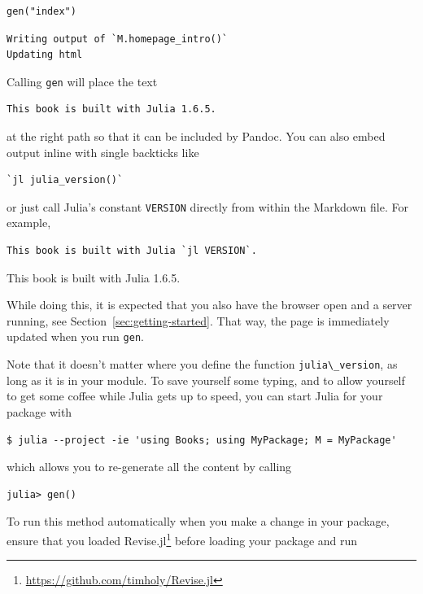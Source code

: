 \documentclass[
  notoc %
]{tufte-book}
\DeclareRobustCommand{\href}[2]{#2\footnote{\url{#1}}}
\newcommand{\passthrough}[1]{#1}
\begin{document}
\begin{lstlisting}
gen("index")
\end{lstlisting}

\begin{lstlisting}[language=Output]
Writing output of `M.homepage_intro()`
Updating html
\end{lstlisting}

Calling \passthrough{\lstinline!gen!} will place the text

\begin{lstlisting}
This book is built with Julia 1.6.5.
\end{lstlisting}

at the right path so that it can be included by Pandoc. You can also
embed output inline with single backticks like

\begin{lstlisting}
`jl julia_version()`
\end{lstlisting}

or just call Julia's constant \passthrough{\lstinline!VERSION!} directly
from within the Markdown file. For example,

\begin{lstlisting}
This book is built with Julia `jl VERSION`.
\end{lstlisting}

This book is built with Julia 1.6.5.

While doing this, it is expected that you also have the browser open and
a server running, see Section~\ref{sec:getting-started}. That way, the
page is immediately updated when you run \passthrough{\lstinline!gen!}.

Note that it doesn't matter where you define the function
\passthrough{\lstinline!julia\_version!}, as long as it is in your
module. To save yourself some typing, and to allow yourself to get some
coffee while Julia gets up to speed, you can start Julia for your
package with

\begin{lstlisting}
$ julia --project -ie 'using Books; using MyPackage; M = MyPackage'
\end{lstlisting}

which allows you to re-generate all the content by calling

\begin{lstlisting}
julia> gen()
\end{lstlisting}

To run this method automatically when you make a change in your package,
ensure that you loaded
\href{https://github.com/timholy/Revise.jl}{Revise.jl} before loading
your package and run
\end{document}
